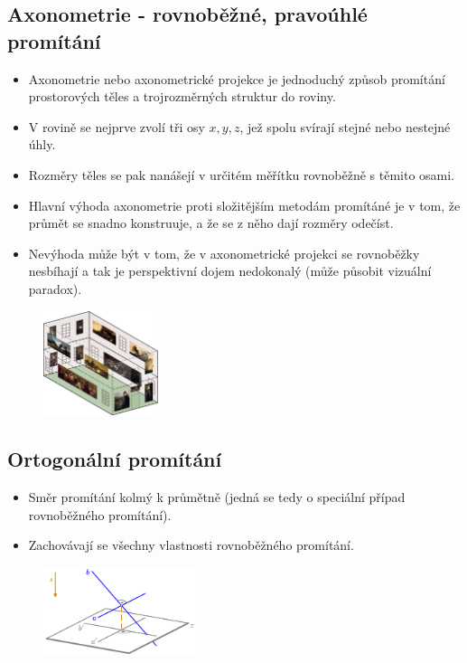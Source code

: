 \subsection{Axonometrie - rovnoběžné, pravoúhlé promítání}
\begin{itemize}
	\item Axonometrie nebo axonometrické projekce je jednoduchý způsob promítání prostorových těles a trojrozměrných struktur do roviny.
	\item V rovině se nejprve zvolí tři osy $x, y, z$, jež spolu svírají stejné nebo nestejné úhly.
	\item Rozměry těles se pak nanášejí v určitém měřítku rovnoběžně s těmito osami.
	\item Hlavní výhoda axonometrie proti složitějším metodám promítáné je v tom, že průmět se snadno konstruuje, a že se z něho dají rozměry odečíst.
	\item Nevýhoda může být v tom, že v axonometrické projekci se rovnoběžky nesbíhají a tak je perspektivní dojem nedokonalý (může působit vizuální paradox).
\end{itemize}

\begin{figure}[H]
\centering
\includegraphics[width=0.3\textwidth]{assets/2_axonometrie}
\end{figure}
\subsection{Ortogonální promítání}
\begin{itemize}
	\item Směr promítání kolmý k průmětně (jedná se tedy o speciální případ rovnoběžného promítání).
	\item Zachovávají se všechny vlastnosti rovnoběžného promítání.
\end{itemize}
\begin{figure}[H]
\centering
\includegraphics[width=0.4\textwidth]{assets/2_ortogonalni.png}
\end{figure}
